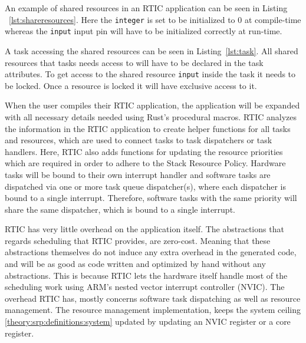 An example of shared resources in an RTIC application can be seen in Listing
~\ref{lst:shareresources}. Here the \texttt{integer} is set to be initialized to
$0$ at compile-time whereas the \texttt{input} input pin will have to be initialized
correctly at run-time.


A task accessing the shared resources can be seen in Listing~\ref{lst:task}.
All shared resources that tasks needs access to will have to be declared in the
task attributes. To get access to the shared resource \texttt{input} inside the
task it needs to be locked. Once a resource is locked it will have exclusive
access to it.


When the user compiles their RTIC application, the application will be expanded
with all necessary details needed using Rust's procedural macros. RTIC analyzes
the information in the RTIC application to create helper functions for all
tasks and resources, which are used to connect tasks to task dispatchers or
task handlers. Here, RTIC also adds functions for updating the resource
priorities which are required in order to adhere to the Stack Resource Policy.
Hardware tasks will be bound to their own interrupt handler and software tasks
are dispatched via one or more task queue dispatcher(s), where each dispatcher is
bound to a single interrupt. Therefore, software tasks with the same priority
will share the same dispatcher, which is bound to a single interrupt.

RTIC has very little overhead on the application itself. The abstractions that
regards scheduling that RTIC provides, are zero-cost. Meaning that these
abstractions themselves do not induce any extra overhead in the generated
code, and will be as good as code written and optimized by hand without any
abstractions. This is because RTIC lets the hardware itself handle most of the
scheduling work using ARM's nested vector interrupt controller (NVIC). The
overhead RTIC has, mostly concerns software task dispatching as well as
resource management. The resource management implementation, keeps the system
ceiling \ref{theory:srp:definitions:system} updated by updating an NVIC
register or a core register.



